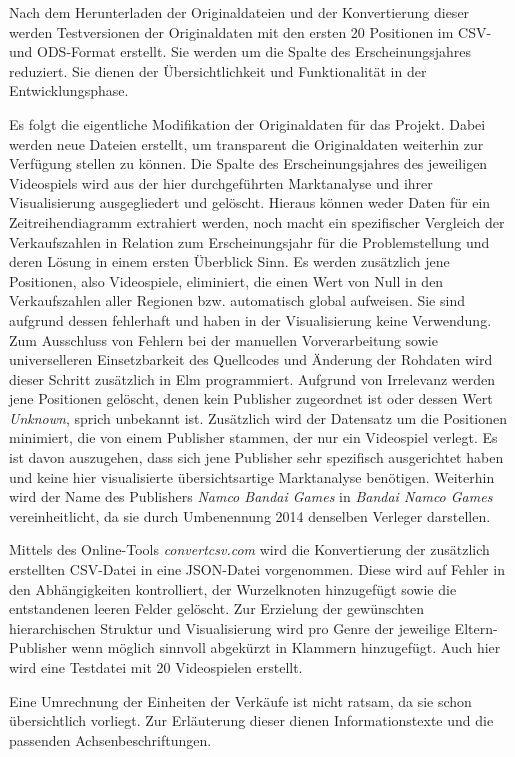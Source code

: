 \documentclass[usegeometry=true]{scrartcl}
\begin{document}
Nach dem Herunterladen der Originaldateien und der Konvertierung dieser werden Testversionen der Originaldaten mit den ersten 20 Positionen im CSV- und ODS-Format erstellt.
Sie werden um die Spalte des Erscheinungsjahres reduziert.
Sie dienen der Übersichtlichkeit und Funktionalität in der Entwicklungsphase.

Es folgt die eigentliche Modifikation der Originaldaten für das Projekt.
Dabei werden neue Dateien erstellt, um transparent die Originaldaten weiterhin zur Verfügung stellen zu können.
Die Spalte des Erscheinungsjahres des jeweiligen Videospiels wird aus der hier durchgeführten Marktanalyse und ihrer Visualisierung ausgegliedert und gelöscht. 
Hieraus können weder Daten für ein Zeitreihendiagramm extrahiert werden, noch macht ein spezifischer Vergleich der Verkaufszahlen in Relation zum Erscheinungsjahr für die Problemstellung und deren Lösung in einem ersten Überblick Sinn. 
Es werden zusätzlich jene Positionen, also Videospiele, eliminiert, die einen Wert von Null in den Verkaufszahlen aller Regionen bzw. automatisch global aufweisen. 
Sie sind aufgrund dessen fehlerhaft und haben in der Visualisierung keine Verwendung. 
Zum Ausschluss von Fehlern bei der manuellen Vorverarbeitung sowie universelleren Einsetzbarkeit des Quellcodes und Änderung der Rohdaten wird dieser Schritt zusätzlich in Elm programmiert.
Aufgrund von Irrelevanz werden jene Positionen gelöscht, denen kein Publisher zugeordnet ist oder dessen Wert \textit{Unknown}, sprich unbekannt ist. 
Zusätzlich wird der Datensatz um die Positionen minimiert, die von einem Publisher stammen, der nur ein Videospiel verlegt. 
Es ist davon auszugehen, dass sich jene Publisher sehr spezifisch ausgerichtet haben und keine hier visualisierte übersichtsartige Marktanalyse benötigen.
Weiterhin wird der Name des Publishers \textit{Namco Bandai Games} in \textit{Bandai Namco Games} vereinheitlicht, da sie durch Umbenennung 2014 denselben Verleger darstellen. 

Mittels des Online-Tools \textit{convertcsv.com} wird die Konvertierung der zusätzlich erstellten CSV-Datei in eine JSON-Datei vorgenommen.
Diese wird auf Fehler in den Abhängigkeiten kontrolliert, der Wurzelknoten hinzugefügt sowie die entstandenen leeren Felder gelöscht. 
Zur Erzielung der gewünschten hierarchischen Struktur und Visualisierung wird pro Genre der jeweilige Eltern-Publisher wenn möglich sinnvoll abgekürzt in Klammern hinzugefügt. 
Auch hier wird eine Testdatei mit 20 Videospielen erstellt.

Eine Umrechnung der Einheiten der Verkäufe ist nicht ratsam, da sie schon übersichtlich vorliegt. 
Zur Erläuterung dieser dienen Informationstexte und die passenden Achsenbeschriftungen.
\end{document}
